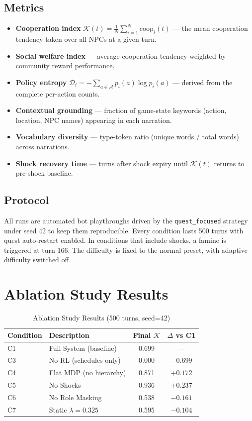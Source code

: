 \documentclass[12pt, a4paper, oneside]{report}
\begin{document}
\subsection{Metrics}

\begin{itemize}[nosep]
    \item \textbf{Cooperation index} $\mathcal{K}(t) = \frac{1}{N} \sum_{i=1}^{N} \text{coop}_i(t)$ --- the mean cooperation tendency taken over all NPCs at a given turn.
    \item \textbf{Social welfare index} --- average cooperation tendency weighted by community reward performance.
    \item \textbf{Policy entropy} $\mathcal{D}_i = -\sum_{a \in \mathcal{A}} p_i(a) \log p_i(a)$ --- derived from the complete per-action counts.
    \item \textbf{Contextual grounding} --- fraction of game-state keywords (action, location, NPC names) appearing in each narration.
    \item \textbf{Vocabulary diversity} --- type-token ratio (unique words / total words) across narrations.
    \item \textbf{Shock recovery time} --- turns after shock expiry until $\mathcal{K}(t)$ returns to pre-shock baseline.
\end{itemize}

\subsection{Protocol}

All runs are automated bot playthroughs driven by the \texttt{quest\_focused} strategy under seed 42 to keep them reproducible. Every condition lasts 500 turns with quest auto-restart enabled. In conditions that include shocks, a famine is triggered at turn 166. The difficulty is fixed to the normal preset, with adaptive difficulty switched off.

\section{Ablation Study Results}
\label{sec:ablation-results}

\begin{table}[H]
\centering
\caption{Ablation Study Results (500 turns, seed=42)}
\label{tab:results}
\begin{tabular}{llcc}
\toprule
\textbf{Condition} & \textbf{Description} & \textbf{Final $\mathcal{K}$} & \textbf{$\Delta$ vs C1} \\
\midrule
C1 & Full System (baseline) & 0.699 & --- \\
C3 & No RL (schedules only) & 0.000 & $-0.699$ \\
C4 & Flat MDP (no hierarchy) & 0.871 & $+0.172$ \\
C5 & No Shocks & 0.936 & $+0.237$ \\
C6 & No Role Masking & 0.538 & $-0.161$ \\
C7 & Static $\lambda = 0.325$ & 0.595 & $-0.104$ \\
\bottomrule
\end{tabular}
\end{table}
\end{document}
